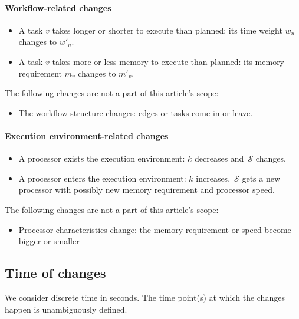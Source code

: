 \documentclass[conference]{IEEEtran}
\newcommand{\cluster}{\,\mathcal{S}}
\begin{document}
    \paragraph{Workflow-related changes}

    \begin{itemize}
        \item A task $v$ takes longer or shorter to execute than planned: its time weight $w_u$ changes to $w'_u$.
        \item A task $v$ takes more or less memory to execute than planned: its memory requirement $m_v$ changes to $m'_v$.

    \end{itemize}

    The following changes are not a part of this article's scope:

    \begin{itemize}
        \item The workflow structure changes: edges or tasks come in or leave.
    \end{itemize}

    \paragraph{Execution environment-related changes }


    \begin{itemize}
        \item A processor exists the execution environment: $k$ decreases and $\cluster$ changes.
        \item A processor enters the execution environment: $k$ increases, $\cluster$ gets a new processor with possibly new memory requirement and processor speed.

    \end{itemize}

    The following changes are not a part of this article's scope:

    \begin{itemize}
        \item Processor characteristics change: the memory requirement or speed become bigger or smaller
    \end{itemize}

    \subsection{Time of changes }

    We consider discrete time in seconds.
    The time point(s) at which the changes happen is unambiguously defined.
\end{document}
